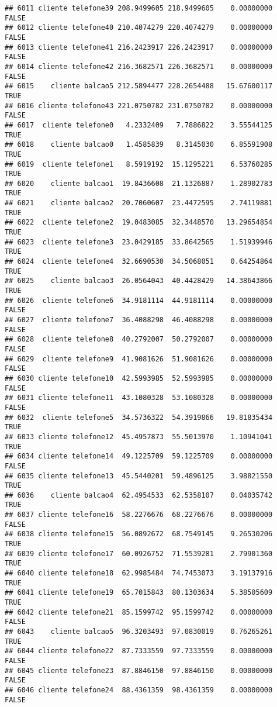 \documentclass[
]{article}
\begin{document}
\begin{verbatim}
## 6011 cliente telefone39 208.9499605 218.9499605    0.00000000    FALSE
## 6012 cliente telefone40 210.4074279 220.4074279    0.00000000    FALSE
## 6013 cliente telefone41 216.2423917 226.2423917    0.00000000    FALSE
## 6014 cliente telefone42 216.3682571 226.3682571    0.00000000    FALSE
## 6015    cliente balcao5 212.5894477 228.2654488   15.67600117     TRUE
## 6016 cliente telefone43 221.0750782 231.0750782    0.00000000    FALSE
## 6017  cliente telefone0   4.2332409   7.7886822    3.55544125     TRUE
## 6018    cliente balcao0   1.4585839   8.3145030    6.85591908     TRUE
## 6019  cliente telefone1   8.5919192  15.1295221    6.53760285     TRUE
## 6020    cliente balcao1  19.8436608  21.1326887    1.28902783     TRUE
## 6021    cliente balcao2  20.7060607  23.4472595    2.74119881     TRUE
## 6022  cliente telefone2  19.0483085  32.3448570   13.29654854     TRUE
## 6023  cliente telefone3  23.0429185  33.8642565    1.51939946     TRUE
## 6024  cliente telefone4  32.6690530  34.5068051    0.64254864     TRUE
## 6025    cliente balcao3  26.0564043  40.4428429   14.38643866     TRUE
## 6026  cliente telefone6  34.9181114  44.9181114    0.00000000    FALSE
## 6027  cliente telefone7  36.4088298  46.4088298    0.00000000    FALSE
## 6028  cliente telefone8  40.2792007  50.2792007    0.00000000    FALSE
## 6029  cliente telefone9  41.9081626  51.9081626    0.00000000    FALSE
## 6030 cliente telefone10  42.5993985  52.5993985    0.00000000    FALSE
## 6031 cliente telefone11  43.1080328  53.1080328    0.00000000    FALSE
## 6032  cliente telefone5  34.5736322  54.3919866   19.81835434     TRUE
## 6033 cliente telefone12  45.4957873  55.5013970    1.10941041     TRUE
## 6034 cliente telefone14  49.1225709  59.1225709    0.00000000    FALSE
## 6035 cliente telefone13  45.5440201  59.4896125    3.98821550     TRUE
## 6036    cliente balcao4  62.4954533  62.5358107    0.04035742     TRUE
## 6037 cliente telefone16  58.2276676  68.2276676    0.00000000    FALSE
## 6038 cliente telefone15  56.0892672  68.7549145    9.26530206     TRUE
## 6039 cliente telefone17  60.0926752  71.5539281    2.79901360     TRUE
## 6040 cliente telefone18  62.9985484  74.7453073    3.19137916     TRUE
## 6041 cliente telefone19  65.7015843  80.1303634    5.38505609     TRUE
## 6042 cliente telefone21  85.1599742  95.1599742    0.00000000    FALSE
## 6043    cliente balcao5  96.3203493  97.0830019    0.76265261     TRUE
## 6044 cliente telefone22  87.7333559  97.7333559    0.00000000    FALSE
## 6045 cliente telefone23  87.8846150  97.8846150    0.00000000    FALSE
## 6046 cliente telefone24  88.4361359  98.4361359    0.00000000    FALSE

\end{verbatim}
\end{document}

